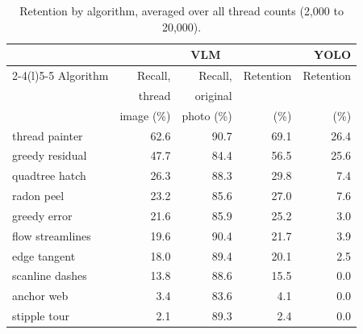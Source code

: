 \begin{table}[t]
\centering
\caption{Retention by algorithm, averaged over all thread counts (2,000 to 20,000).}
\label{tab:by-algorithm}
\footnotesize
\setlength{\tabcolsep}{4pt}
\begin{tabular}{@{}lrrrr@{}}
\toprule
 & \multicolumn{3}{c}{VLM} & YOLO \\
\cmidrule(lr){2-4}\cmidrule(l){5-5}
Algorithm & Recall, & Recall, & Retention & Retention \\
 & thread & original & & \\
 & image (\%) & photo (\%) & (\%) & (\%) \\
\midrule
thread painter & 62.6 & 90.7 & 69.1 & 26.4 \\
greedy residual & 47.7 & 84.4 & 56.5 & 25.6 \\
quadtree hatch & 26.3 & 88.3 & 29.8 & 7.4 \\
radon peel & 23.2 & 85.6 & 27.0 & 7.6 \\
greedy error & 21.6 & 85.9 & 25.2 & 3.0 \\
flow streamlines & 19.6 & 90.4 & 21.7 & 3.9 \\
edge tangent & 18.0 & 89.4 & 20.1 & 2.5 \\
scanline dashes & 13.8 & 88.6 & 15.5 & 0.0 \\
anchor web & 3.4 & 83.6 & 4.1 & 0.0 \\
stipple tour & 2.1 & 89.3 & 2.4 & 0.0 \\
\bottomrule
\end{tabular}
\end{table}
